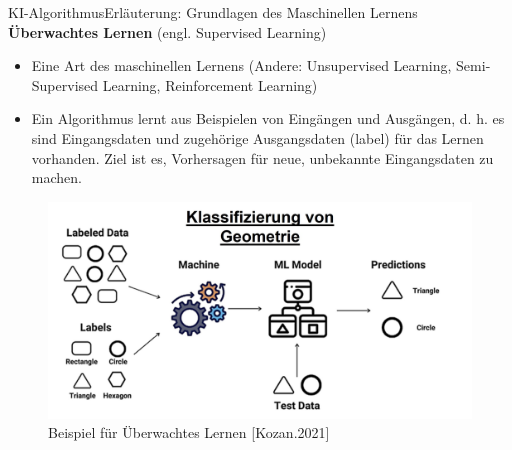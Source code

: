\documentclass[169, handout	]{THIbeamer} %
\begin{document}
	\begin{frame}{KI-Algorithmus}{Erläuterung: Grundlagen des Maschinellen Lernens}
		\small	
		\textbf{Überwachtes Lernen} (engl. Supervised Learning)	
		\footnotesize
		\begin{itemize}
			\item Eine Art des maschinellen Lernens (Andere: Unsupervised Learning, Semi-Supervised Learning, Reinforcement Learning)
			\item Ein Algorithmus lernt aus Beispielen von Eingängen und Ausgängen, d. h. es sind Eingangsdaten und zugehörige Ausgangsdaten (label)
für das Lernen vorhanden. Ziel ist es, Vorhersagen für neue, unbekannte Eingangsdaten zu machen.
		\end{itemize}
		\begin{figure}
			\includegraphics[scale=0.3]{required/supervised_learning.jpg}
			\caption{Beispiel für Überwachtes Lernen [Kozan.2021]}
        	\label{Ground Subtraction}
       	\end{figure}
	\end{frame}
\end{document}
